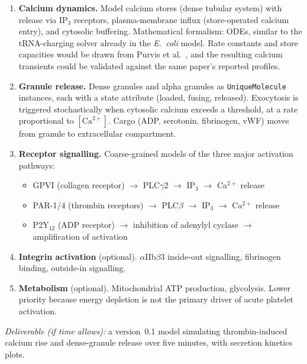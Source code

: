 \documentclass[11pt,a4paper]{article}
\begin{document}
\begin{enumerate}
  \item \textbf{Calcium dynamics.}  Model calcium stores (dense tubular system)
    with release via IP$_3$ receptors, plasma-membrane influx (store-operated
    calcium entry), and cytosolic buffering.  Mathematical formalism: ODEs,
    similar to the tRNA-charging solver already in the \textit{E.~coli}
    model.  Rate constants and store capacities would be drawn from Purvis
    et al.~\cite{Purvis2008}, and the resulting calcium transients could be
    validated against the same paper's reported profiles.

  \item \textbf{Granule release.}  Dense granules and alpha granules as
    \texttt{UniqueMolecule} instances, each with a state attribute (loaded,
    fusing, released).  Exocytosis is triggered stochastically when
    cytosolic calcium exceeds a threshold, at a rate proportional to
    $[\text{Ca}^{2+}]$.  Cargo (ADP, serotonin, fibrinogen, vWF) moves from
    granule to extracellular compartment.

  \item \textbf{Receptor signalling.}  Coarse-grained models of the three
    major activation pathways:
    \begin{itemize}[nosep]
      \item GPVI (collagen receptor) $\to$ PLC$\gamma$2 $\to$ IP$_3$ $\to$
            Ca$^{2+}$ release
      \item PAR-1/4 (thrombin receptors) $\to$ PLC$\beta$ $\to$ IP$_3$ $\to$
            Ca$^{2+}$ release
      \item P2Y$_{12}$ (ADP receptor) $\to$ inhibition of adenylyl cyclase
            $\to$ amplification of activation
    \end{itemize}

  \item \textbf{Integrin activation} (optional).  $\alpha$IIb$\beta$3
    inside-out signalling, fibrinogen binding, outside-in signalling.

  \item \textbf{Metabolism} (optional).  Mitochondrial ATP production,
    glycolysis.  Lower priority because energy depletion is not the primary
    driver of acute platelet activation.
\end{enumerate}

\emph{Deliverable (if time allows):} a version~0.1 model simulating
thrombin-induced calcium rise and dense-granule release over five minutes,
with secretion kinetics plots.
\end{document}
